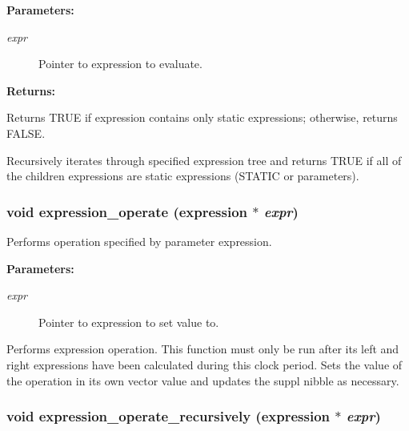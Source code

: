 \begin{Desc}
\item[{\bf Parameters: }]\par
\begin{description}
\item[
{\em expr}]Pointer to expression to evaluate.

\end{description}
\end{Desc}
\begin{Desc}
\item[{\bf Returns: }]\par
Returns TRUE if expression contains only static expressions; otherwise, returns FALSE.

\end{Desc}
Recursively iterates through specified expression tree and returns TRUE if all of the children expressions are static expressions (STATIC or parameters). 
\subsubsection{\setlength{\rightskip}{0pt plus 5cm}void expression\_\-operate ({\bf expression} $\ast$ {\em expr})}\label{expr_8c_a19}


Performs operation specified by parameter expression.

\begin{Desc}
\item[{\bf Parameters: }]\par
\begin{description}
\item[
{\em expr}]Pointer to expression to set value to.

\end{description}
\end{Desc}
Performs expression operation. This function must only be run after its left and right expressions have been calculated during this clock period. Sets the value of the operation in its own vector value and updates the suppl nibble as necessary. 
\subsubsection{\setlength{\rightskip}{0pt plus 5cm}void expression\_\-operate\_\-recursively ({\bf expression} $\ast$ {\em expr})}\label{expr_8c_a20}


